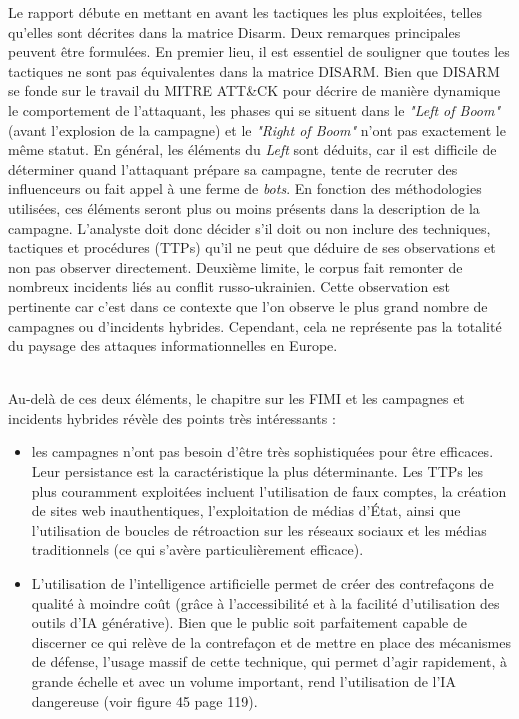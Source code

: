 \documentclass[a4paper]{article}
\begin{document}
Le rapport débute en mettant en avant les tactiques les plus exploitées, telles qu'elles sont décrites dans la matrice Disarm. Deux remarques principales peuvent être formulées.
En premier lieu, il est essentiel de souligner que toutes les tactiques ne sont pas équivalentes dans la matrice DISARM. Bien que DISARM se fonde sur le travail du MITRE ATT\&CK pour décrire de manière dynamique le comportement de l'attaquant, les phases qui se situent dans le \textit{"Left of Boom"} (avant l'explosion de la campagne) et le \textit{"Right of Boom"} n'ont pas exactement le même statut. En général, les éléments du \textit{Left} sont déduits, car il est difficile de déterminer quand l'attaquant prépare sa campagne, tente de recruter des influenceurs ou fait appel à une ferme de \textit{bots}. En fonction des méthodologies utilisées, ces éléments seront plus ou moins présents dans la description de la campagne. L'analyste doit donc décider s'il doit ou non inclure des techniques, tactiques et procédures (TTPs) qu'il ne peut que déduire de ses observations et non pas observer directement.
Deuxième limite, le corpus fait remonter de nombreux incidents liés au conflit russo-ukrainien. Cette observation est pertinente car c'est dans ce contexte que l'on observe le plus grand nombre de campagnes ou d'incidents hybrides. Cependant, cela ne représente pas la totalité du paysage des attaques informationnelles en Europe.

\\Au-delà de ces deux éléments, le chapitre sur les FIMI et les campagnes et incidents hybrides révèle des points très intéressants :
\\
\begin{itemize}
\item les campagnes n'ont pas besoin d'être très sophistiquées pour être efficaces. Leur persistance est la caractéristique la plus déterminante. Les TTPs les plus couramment exploitées incluent l'utilisation de faux comptes, la création de sites web inauthentiques, l'exploitation de médias d'État, ainsi que l'utilisation de boucles de rétroaction sur les réseaux sociaux et les médias traditionnels (ce qui s'avère particulièrement efficace).
\item L'utilisation de l'intelligence artificielle permet de créer des contrefaçons de qualité à moindre coût (grâce à l'accessibilité et à la facilité d'utilisation des outils d'IA générative). Bien que le public soit parfaitement capable de discerner ce qui relève de la contrefaçon et de mettre en place des mécanismes de défense, l'usage massif de cette technique, qui permet d'agir rapidement, à grande échelle et avec un volume important, rend l'utilisation de l'IA dangereuse (voir figure 45 page 119).
\\

\end{itemize}
\end{document}
